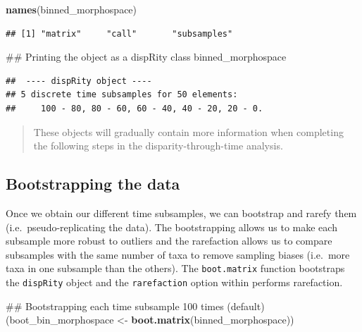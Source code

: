 \documentclass[]{book}
\newenvironment{Shaded}{\begin{snugshade}}{\end{snugshade}}
\newcommand{\KeywordTok}[1]{\textcolor[rgb]{0.13,0.29,0.53}{\textbf{#1}}}
\newcommand{\StringTok}[1]{\textcolor[rgb]{0.31,0.60,0.02}{#1}}
\newcommand{\NormalTok}[1]{#1}
\theoremstyle{definition}
\theoremstyle{definition}
\theoremstyle{remark}
\begin{document}
\begin{Shaded}
\begin{Highlighting}[]
\KeywordTok{names}\NormalTok{(binned_morphospace)}
\end{Highlighting}
\end{Shaded}

\begin{verbatim}
## [1] "matrix"     "call"       "subsamples"
\end{verbatim}

\begin{Shaded}
\begin{Highlighting}[]
\NormalTok{## Printing the object as a dispRity class}
\NormalTok{binned_morphospace}
\end{Highlighting}
\end{Shaded}

\begin{verbatim}
##  ---- dispRity object ---- 
## 5 discrete time subsamples for 50 elements:
##     100 - 80, 80 - 60, 60 - 40, 40 - 20, 20 - 0.
\end{verbatim}

\begin{quote}
These objects will gradually contain more information when completing
the following steps in the disparity-through-time analysis.
\end{quote}

\subsection{Bootstrapping the data}\label{bootstrapping-the-data}

Once we obtain our different time subsamples, we can bootstrap and
rarefy them (i.e.~pseudo-replicating the data). The bootstrapping allows
us to make each subsample more robust to outliers and the rarefaction
allows us to compare subsamples with the same number of taxa to remove
sampling biases (i.e.~more taxa in one subsample than the others). The
\texttt{boot.matrix} function bootstraps the \texttt{dispRity} object
and the \texttt{rarefaction} option within performs rarefaction.

\begin{Shaded}
\begin{Highlighting}[]
\NormalTok{## Bootstrapping each time subsample 100 times (default)}
\NormalTok{(boot_bin_morphospace <-}\StringTok{ }\KeywordTok{boot.matrix}\NormalTok{(binned_morphospace))}
\end{Highlighting}
\end{Shaded}
\end{document}
